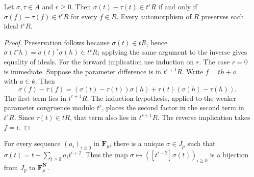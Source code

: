\begin{lemma}
\label{lem:aut-congruence-parameter}
\leanok
Let $\sigma,\tau\in A$ and $r\ge0$. Then
$\sigma(t)-\tau(t)\in t^rR$ if and only if
$\sigma(f)-\tau(f)\in t^rR$ for every $f\in R$.
Every automorphism of $R$ preserves each ideal $t^rR$.
\end{lemma}

\begin{proof}
Preservation follows because $\sigma(t)\in tR$, hence
$\sigma(t^r h)=\sigma(t)^r\sigma(h)\in t^rR$; applying the same
argument to the inverse gives equality of ideals.
For the forward implication use induction on $r$. The case $r=0$
is immediate. Suppose the parameter difference is in $t^{r+1}R$.
Write $f=th+a$ with $a\in k$. Then
\[
\sigma(f)-\tau(f)=(\sigma(t)-\tau(t))\sigma(h)
                   +\tau(t)(\sigma(h)-\tau(h)).
\]
The first term lies in $t^{r+1}R$. The induction hypothesis, applied
to the weaker parameter congruence modulo $t^r$, places the second
factor in the second term in $t^rR$. Since $\tau(t)\in tR$, that
term also lies in $t^{r+1}R$. The reverse implication takes $f=t$.
\end{proof}

\begin{lemma}
\label{lem:nottingham-parameters}
\leanok
For every sequence $(a_i)_{i\ge0}$ in $\mathbf F_p$, there is a unique
$\sigma\in J_p$ such that
$\sigma(t)=t+\sum_{i\ge0}a_i t^{i+2}$.
Thus the map $\sigma\mapsto([t^{i+2}]\sigma(t))_{i\ge0}$ is a bijection
from $J_p$ to $\mathbf F_p^{\mathbf N}$.
\end{lemma}

